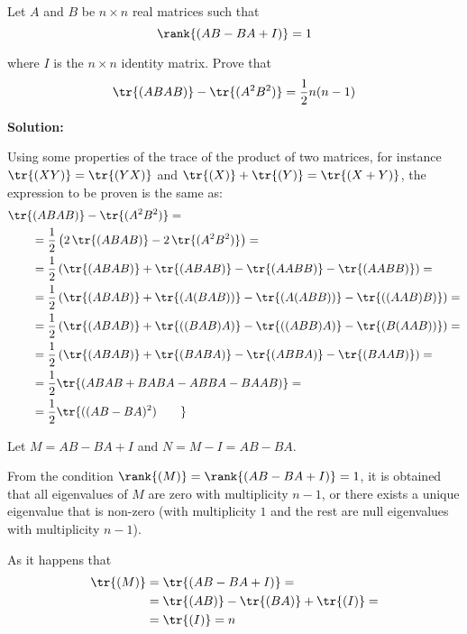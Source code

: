 \documentclass[../../main.tex]{subfiles}
\begin{document}
  \begin{shaded}
    Let $A$ and $B$ be $n \times n$ real matrices such that
    $$
    \rank{(AB - BA + I)} = 1
    $$

    where $I$ is the $n \times n$ identity matrix. Prove that
    $$
    \tr{(ABAB)} - \tr{(A^2 B^2)} = \frac{1}{2} n (n - 1)
    $$
  \end{shaded}

  \textbf{Solution:}

  Using some properties of the trace of the product of two matrices, for instance $\tr{(XY)} = \tr{(YX)}$ and $\tr{(X)} + \tr{(Y)} = \tr{(X + Y)}$, the expression to be proven is the same as:
  \begin{equation*}
    \begin{split}
      &
      \tr{(ABAB)} - \tr{(A^2 B^2)} = \\ & \qquad =
      \frac{1}{2}\left(2 \, \tr{(ABAB)} - 2 \, \tr{(A^2 B^2)}\right) = \\ & \qquad =
      \frac{1}{2}\left(\tr{(ABAB)} + \tr{(ABAB)} - \tr{(AABB)} - \tr{(AABB)}\right) = \\ & \qquad =
      \frac{1}{2}\left(\tr{(ABAB)} + \tr{(A(BAB))} - \tr{(A(ABB))} - \tr{((AAB)B)}\right) = \\ & \qquad =
      \frac{1}{2}\left(\tr{(ABAB)} + \tr{((BAB)A)} - \tr{((ABB)A)} - \tr{(B(AAB))}\right) = \\ & \qquad =
      \frac{1}{2}\left(\tr{(ABAB)} + \tr{(BABA)} - \tr{(ABBA)} - \tr{(BAAB)}\right) = \\ & \qquad =
      \frac{1}{2}\tr{(ABAB + BABA - ABBA - BAAB)} = \\ & \qquad =
      \frac{1}{2}\tr{((AB - BA)^2)\qquad }
    \end{split}
  \end{equation*}

  Let $M = AB - BA + I$ and $N = M - I = AB - BA$.

  From the condition $\rank{(M)} = \rank{(AB - BA + I)} = 1$, it is obtained that all eigenvalues of $M$ are zero with multiplicity $n - 1$, or there exists a unique eigenvalue that is non-zero (with multiplicity $1$ and the rest are null eigenvalues with multiplicity $n - 1$).

  As it happens that
  \begin{equation*}
    \begin{split}
      \tr{(M)} & =
      \tr{(AB - BA + I)} = \\ & =
      \tr{(AB)} - \tr{(BA)} + \tr{(I)} = \\ & =
      \tr{(I)} = n
    \end{split}
  \end{equation*}
\end{document}
